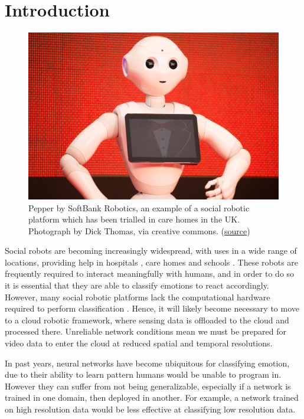 \documentclass[sigconf]{acmart}
\begin{document}
\section{Introduction}

\begin{figure}
  \includegraphics[width=\linewidth]{care-robot.jpg}
  \caption{Pepper by SoftBank Robotics, an example of a social robotic
  platform which has been trialled in care homes in the UK. Photograph by Dick
  Thomas, via creative commons.
  (\href{https://search.creativecommons.org/photos/e802da62-8b2f-4f10-9520-bb6c5a0e03db}{source})}
  \label{fig:pepper}
\end{figure}

Social robots are becoming increasingly widespread, with uses in a wide range
of locations, providing help in hospitals \cite{moxi}, care homes \cite{ElliQ}
and schools \cite{AV1}. These robots are frequently required to
interact meaningfully with humans, and in order to do so it is essential that
they are able to classify emotions to react accordingly. However, many social robotic
platforms lack the computational hardware required to perform classification
\cite{celiktutan18}.
Hence, it will likely become necessary to move to a cloud robotic framework,
where sensing data is offloaded to the cloud and processed there. Unreliable
network conditions mean we must be prepared for video data to enter the cloud
at reduced spatial and temporal resolutions. 

In past years, neural networks have become ubiquitous for classifying emotion,
due to their ability to learn pattern humans would be unable to program in.
However they can suffer from not being generalizable, especially if a network
is trained in one domain, then deployed in another. For example, a network
trained on high resolution data would be less effective at classifying low
resolution data. 
\end{document}
